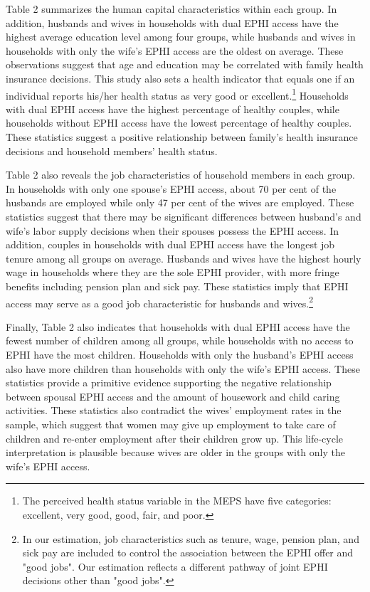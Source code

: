 \documentclass[legno,11pt]{article}
\begin{document}
Table 2 summarizes the human capital characteristics within each
group.
In addition, husbands and wives in households with dual EPHI access have
the highest average education level among four groups, while
husbands and wives in households with only the wife's EPHI access
are the oldest on average. These observations suggest that age and
education may be correlated with family health insurance decisions.
This study also sets a health indicator that equals one if an
individual reports his/her health status as very good or
excellent.\footnote{The perceived health status variable in the MEPS
have five categories: excellent, very good, good, fair, and poor.}
Households with dual EPHI access have the highest percentage of
healthy couples, while households without EPHI access have the
lowest percentage of healthy couples. These statistics suggest a
positive relationship between family's health insurance decisions
and household members' health status.
\par

Table 2 also reveals the job characteristics of household members in
each group. In households with only one spouse's EPHI access, about
70 per cent of the husbands are employed while only 47 per cent of
the wives are employed. These statistics suggest that there may be
significant differences between husband's and wife's labor supply
decisions when their spouses possess the EPHI access. In addition,
couples in households with dual EPHI access have the longest job
tenure among all groups on average. Husbands and wives have the
highest hourly wage in households where they are the sole EPHI
provider, with more fringe benefits including pension plan and sick
pay. These statistics imply that EPHI access may serve as a good job
characteristic for husbands and wives.\footnote{In our estimation,
job characteristics such as tenure, wage, pension plan, and sick pay
are included to control the association between the EPHI offer and
"good jobs". Our estimation reflects a different pathway of joint
EPHI decisions other than "good jobs".}
\par

Finally, Table 2 also indicates that households with dual EPHI access
have the fewest number of children among all groups, while
households with no access to EPHI have the most children. Households
with only the husband's EPHI access also have more children than
households with only the wife's EPHI access.
These statistics provide a primitive evidence supporting the
negative relationship between spousal EPHI access and the amount of
housework and child caring activities.
These statistics also contradict the wives' employment rates in the sample,
which suggest that women may give up employment to take care of
children and re-enter employment after their children grow up. This
life-cycle interpretation is plausible because wives are older in
the groups with only the wife's EPHI access.
\par
\end{document}
